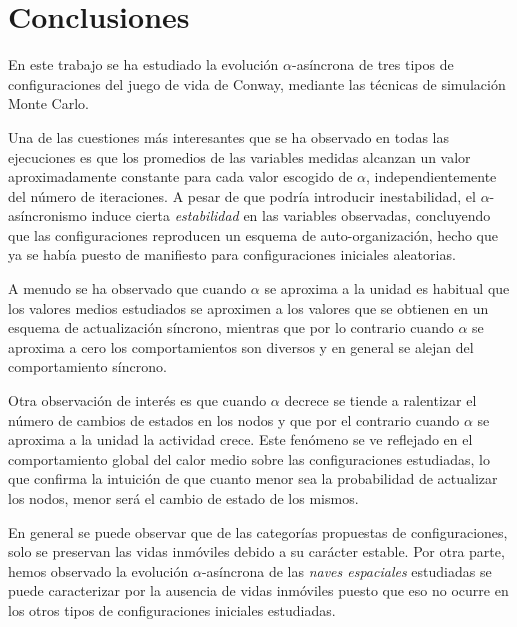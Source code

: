 \documentclass[../proyecto.tex]{memoir}
\begin{document}
\chapter{Conclusiones}

En este trabajo se ha estudiado la evolución $\alpha$-asíncrona de tres tipos de configuraciones del juego de vida de Conway, mediante las técnicas de simulación Monte Carlo.

Una de las cuestiones más interesantes que se ha observado en todas las ejecuciones es que los promedios de las variables medidas alcanzan un valor aproximadamente constante para cada valor escogido de $\alpha$, independientemente del número de iteraciones. A pesar de que podría introducir inestabilidad, el $\alpha$-asíncronismo induce cierta \textit{estabilidad} en las variables observadas, concluyendo que las configuraciones reproducen un esquema de auto-organización, hecho que ya se había puesto de manifiesto para configuraciones iniciales aleatorias. 

A menudo se ha observado que cuando $\alpha$ se aproxima a la unidad es habitual que los valores medios estudiados se aproximen a los valores que se obtienen en un esquema de actualización síncrono, mientras que por lo contrario cuando $\alpha$ se aproxima a cero los comportamientos son diversos y en general se alejan del comportamiento síncrono.

Otra observación de interés es que cuando $\alpha$ decrece se tiende a ralentizar el número de cambios de estados en los nodos y que por el contrario cuando $\alpha$ se aproxima a la unidad la actividad crece. Este fenómeno se ve reflejado en el comportamiento global del calor medio sobre las configuraciones estudiadas, lo que confirma la intuición de que cuanto menor sea la probabilidad de actualizar los nodos, menor será el cambio de estado de los mismos.

En general se puede observar que de las categorías propuestas de configuraciones, solo se preservan las vidas inmóviles debido a su carácter estable. Por otra parte, hemos observado  la evolución $\alpha$-asíncrona de las \textit{naves espaciales} estudiadas se puede caracterizar por la ausencia de vidas inmóviles puesto que eso no ocurre en los otros tipos de configuraciones iniciales estudiadas.
\end{document}
